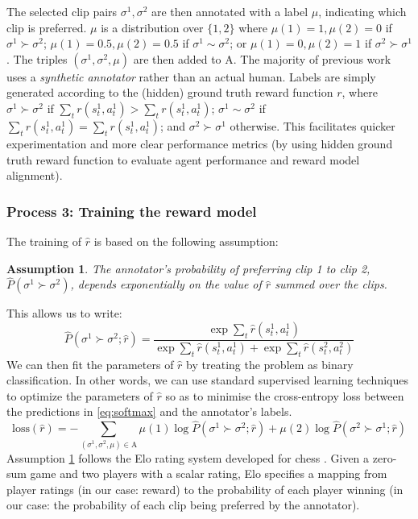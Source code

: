 \documentclass[11pt, a4paper, bibliography=totoc]{report}
\newcommand{\rp}{\hat{r}}
\newcommand{\annbuff}{\mathrm{A}}
\newtheorem{assumption}{Assumption}
\begin{document}
The selected clip pairs $ \sigma^1, \sigma^2 $ are then annotated with a label $ \mu $, indicating which clip is preferred. $ \mu $ is a distribution over $ \{1,2\} $ where $ \mu(1) = 1, \mu(2) = 0 $ if $ \sigma^1 \succ \sigma^2 $; $ \mu(1) = 0.5, \mu(2) = 0.5 $ if $ \sigma^1 \sim \sigma^2 $; or $ \mu(1) = 0, \mu(2) = 1 $ if $ \sigma^2 \succ \sigma^1 $. The triples $ (\sigma^1, \sigma^2, \mu) $ are then added to $ \annbuff $. The majority of previous work uses a \textit{synthetic annotator} rather than an actual human. Labels are simply generated according to the (hidden) ground truth reward function $ r $, where $ \sigma^1 \succ \sigma^2 $ if $ \sum_t r(s_t^1, a_t^1) > \sum_t r(s_t^1, a_t^1) $; $ \sigma^1 \sim \sigma^2 $ if $ \sum_t r(s_t^1, a_t^1) = \sum_t r(s_t^1, a_t^1) $; and $ \sigma^2 \succ \sigma^1 $ otherwise. This facilitates quicker experimentation and more clear performance metrics (by using hidden ground truth reward function to evaluate agent performance and reward model alignment).

\subsubsection{Process 3: Training the reward model}
The training of $ \rp $ is based on the following assumption:
\begin{assumption} \label{assumption:1}
	The annotator's probability of preferring clip 1 to clip 2, $ \hat{P}(\sigma^1 \succ \sigma^2) $, depends exponentially on the value of $ \hat{r} $ summed over the clips.
\end{assumption}
This allows us to write:
\begin{equation} \label{eq:softmax}
\hat{P}(\sigma^1 \succ \sigma^2 ; \rp) = \frac{\exp \sum_t \hat{r}(s_t^1, a_t^1)}{\exp \sum_t \hat{r}(s_t^1, a_t^1) + \exp \sum_t \hat{r}(s_t^2, a_t^2)}
\end{equation}
We can then fit the parameters of $ \rp $ by treating the problem as binary classification. In other words, we can use standard supervised learning techniques to optimize the parameters of $ \rp $ so as to minimise the cross-entropy loss between the predictions in \ref{eq:softmax} and the annotator's labels.
\begin{equation} \label{eq:loss}
\text{loss}(\hat{r}) = -\sum_{(\sigma^1, \sigma^2, \mu) \in \annbuff} \mu(1) \log \hat{P}(\sigma^1 \succ \sigma^2 ; \rp) + \mu(2)\log \hat{P}(\sigma^2 \succ \sigma^1 ; \rp)
\end{equation}
Assumption \ref{assumption:1} follows the Elo rating system developed for chess \cite{elo1978rating}. Given a zero-sum game and two players with a scalar rating, Elo specifies a mapping from player ratings (in our case: reward) to the probability of each player winning (in our case: the probability of each clip being preferred by the annotator).
\end{document}
